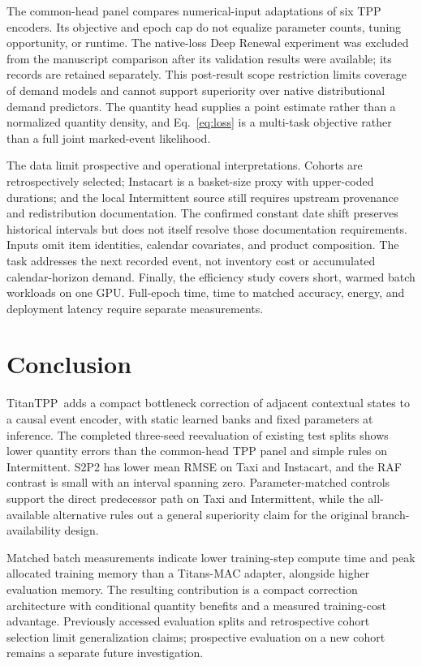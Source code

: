 \documentclass[runningheads]{llncs}
\newcommand{\method}{TitanTPP}
\begin{document}
The common-head panel compares numerical-input adaptations of six TPP
encoders. Its objective and epoch cap do not equalize parameter counts,
tuning opportunity, or runtime. The native-loss Deep Renewal experiment
was excluded from the manuscript comparison after its validation results
were available; its records are retained separately. This post-result
scope restriction limits coverage of demand models and cannot support
superiority over native distributional demand predictors.
The quantity head supplies a point estimate rather than a normalized
quantity density, and Eq.~\eqref{eq:loss} is a multi-task objective rather
than a full joint marked-event likelihood.

The data limit prospective and operational interpretations. Cohorts are
retrospectively selected; Instacart is a basket-size proxy with upper-coded
durations; and the local Intermittent source still requires upstream
provenance and redistribution documentation. The confirmed constant date
shift preserves historical intervals but does not itself resolve those
documentation requirements. Inputs omit item identities, calendar
covariates, and product composition. The task addresses the next recorded
event, not inventory cost or accumulated calendar-horizon demand.
Finally, the efficiency study covers short, warmed batch workloads on one
GPU. Full-epoch time, time to matched accuracy, energy, and deployment
latency require separate measurements.

\section{Conclusion}
\method\ adds a compact bottleneck correction of adjacent contextual states
to a causal event encoder, with static learned banks and fixed parameters
at inference. The completed three-seed reevaluation of existing test splits
shows lower quantity errors than the common-head TPP panel and simple
rules on Intermittent. S2P2 has lower mean RMSE on Taxi and Instacart, and
the RAF contrast is small with an interval spanning zero. Parameter-matched
controls support the direct predecessor path on Taxi and Intermittent,
while the all-available alternative rules out a general superiority claim
for the original branch-availability design.

Matched batch measurements indicate lower training-step compute time and
peak allocated training memory than a Titans-MAC adapter, alongside higher
evaluation memory. The resulting contribution is a compact correction
architecture with conditional quantity benefits and a measured training-cost
advantage. Previously accessed evaluation splits and retrospective cohort
selection limit generalization claims; prospective evaluation on a new
cohort remains a separate future investigation.
\end{document}
